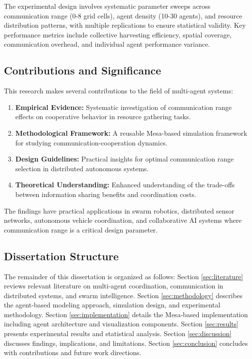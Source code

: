 \documentclass[12pt,a4paper]{article}
\begin{document}
The experimental design involves systematic parameter sweeps across communication range (0-8 grid cells), agent density (10-30 agents), and resource distribution patterns, with multiple replications to ensure statistical validity. Key performance metrics include collective harvesting efficiency, spatial coverage, communication overhead, and individual agent performance variance.

\subsection{Contributions and Significance}

This research makes several contributions to the field of multi-agent systems:

\begin{enumerate}
    \item \textbf{Empirical Evidence:} Systematic investigation of communication range effects on cooperative behavior in resource gathering tasks.
    \item \textbf{Methodological Framework:} A reusable Mesa-based simulation framework for studying communication-cooperation dynamics.
    \item \textbf{Design Guidelines:} Practical insights for optimal communication range selection in distributed autonomous systems.
    \item \textbf{Theoretical Understanding:} Enhanced understanding of the trade-offs between information sharing benefits and coordination costs.
\end{enumerate}

The findings have practical applications in swarm robotics, distributed sensor networks, autonomous vehicle coordination, and collaborative AI systems where communication range is a critical design parameter.

\subsection{Dissertation Structure}

The remainder of this dissertation is organized as follows: Section \ref{sec:literature} reviews relevant literature on multi-agent coordination, communication in distributed systems, and swarm intelligence. Section \ref{sec:methodology} describes the agent-based modeling approach, simulation design, and experimental methodology. Section \ref{sec:implementation} details the Mesa-based implementation including agent architecture and visualization components. Section \ref{sec:results} presents experimental results and statistical analysis. Section \ref{sec:discussion} discusses findings, implications, and limitations. Section \ref{sec:conclusion} concludes with contributions and future work directions.
\end{document}
